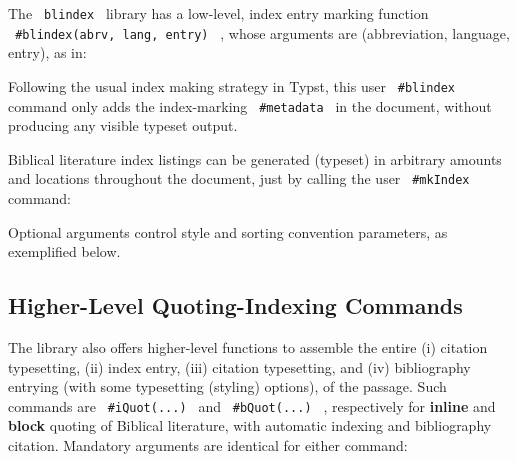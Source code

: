 The \texttt{\ blindex\ } library has a low-level, index entry marking
function \texttt{\ \#blindex(abrv,\ lang,\ entry)\ } , whose arguments
are (abbreviation, language, entry), as in:

\begin{Shaded}
\begin{Highlighting}[]
\end{Highlighting}
\end{Shaded}

Following the usual index making strategy in Typst, this user
\texttt{\ \#blindex\ } command only adds the index-marking
\texttt{\ \#metadata\ } in the document, without producing any visible
typeset output.

Biblical literature index listings can be generated (typeset) in
arbitrary amounts and locations throughout the document, just by calling
the user \texttt{\ \#mkIndex\ } command:

\begin{Shaded}
\begin{Highlighting}[]
\end{Highlighting}
\end{Shaded}

Optional arguments control style and sorting convention parameters, as
exemplified below.

\subsection{Higher-Level Quoting-Indexing
Commands}\label{higher-level-quoting-indexing-commands}

The library also offers higher-level functions to assemble the entire
(i) citation typesetting, (ii) index entry, (iii) citation typesetting,
and (iv) bibliography entrying (with some typesetting (styling)
options), of the passage. Such commands are \texttt{\ \#iQuot(...)\ }
and \texttt{\ \#bQuot(...)\ } , respectively for \textbf{inline} and
\textbf{block} quoting of Biblical literature, with automatic indexing
and bibliography citation. Mandatory arguments are identical for either
command:

\begin{Shaded}
\begin{Highlighting}[]

\end{Highlighting}
\end{Shaded}


